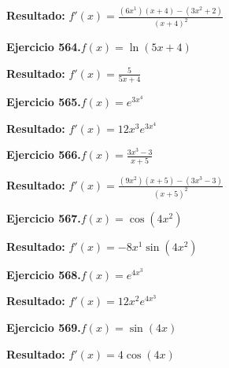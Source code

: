 \documentclass[10pt,a4paper]{article}
\begin{document}
\begin{solbox}
\textbf{Resultado:} \(\displaystyle f'(x) = \frac{(6x^{1})(x+4) - (3x^{2} +2)}{(x+4)^2}\)
\end{solbox}

\begin{ejbox}
\textbf{Ejercicio 564.}\quad $f(x) = \ln(5x + 4)$
\end{ejbox}

\begin{solbox}
\textbf{Resultado:} \(\displaystyle f'(x) = \frac{5}{5x + 4}\)
\end{solbox}

\newpage
\begin{ejbox}
\textbf{Ejercicio 565.}\quad $f(x) = e^{3x^{4}}$
\end{ejbox}

\begin{solbox}
\textbf{Resultado:} \(\displaystyle f'(x) = 12x^{3}e^{3x^{4}}\)
\end{solbox}

\begin{ejbox}
\textbf{Ejercicio 566.}\quad $f(x) = \frac{3x^{3} -3}{x + 5}$
\end{ejbox}

\begin{solbox}
\textbf{Resultado:} \(\displaystyle f'(x) = \frac{(9x^{2})(x+5) - (3x^{3} -3)}{(x+5)^2}\)
\end{solbox}

\begin{ejbox}
\textbf{Ejercicio 567.}\quad $f(x) = \cos(4x^{2})$
\end{ejbox}

\begin{solbox}
\textbf{Resultado:} \(\displaystyle f'(x) = -8x^{1}\sin(4x^{2})\)
\end{solbox}

\newpage
\begin{ejbox}
\textbf{Ejercicio 568.}\quad $f(x) = e^{4x^{3}}$
\end{ejbox}

\begin{solbox}
\textbf{Resultado:} \(\displaystyle f'(x) = 12x^{2}e^{4x^{3}}\)
\end{solbox}

\begin{ejbox}
\textbf{Ejercicio 569.}\quad $f(x) = \sin(4x)$
\end{ejbox}

\begin{solbox}
\textbf{Resultado:} \(\displaystyle f'(x) = 4\cos(4x)\)
\end{solbox}
\end{document}
